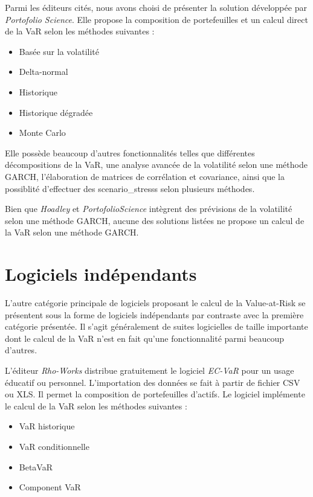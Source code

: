 		Parmi les éditeurs cités, nous avons choisi de présenter la solution développée par \textit{Portofolio Science}. Elle propose la composition de portefeuilles et un calcul direct de la VaR selon les méthodes suivantes :
		\begin{itemize}
			\item Basée sur la volatilité
			\item Delta-normal
			\item Historique
			\item Historique dégradée
			\item Monte Carlo
		\end{itemize}

		Elle possède beaucoup d’autres fonctionnalités telles que différentes décompositions de la VaR, une analyse avancée de la volatilité selon une méthode GARCH, l’élaboration de matrices de corrélation et covariance, ainsi que la possiblité d’effectuer des \glspl{scenario_stress} selon plusieurs méthodes. 

		Bien que \textit{Hoadley} et \textit{PortofolioScience} intègrent des prévisions de la volatilité selon une méthode GARCH, aucune des solutions listées ne propose un calcul de la VaR selon une méthode GARCH.


	\section{Logiciels indépendants}

		L’autre catégorie principale de logiciels proposant le calcul de la Value-at-Risk se présentent sous la forme de logiciels indépendants par contraste avec la première catégorie présentée. Il s’agit généralement de suites logicielles de taille importante dont le calcul de la VaR n’est en fait qu’une fonctionnalité parmi beaucoup d’autres.

		L’éditeur \textit{Rho-Works} distribue gratuitement le logiciel \textit{EC-VaR} pour un usage éducatif ou personnel. L’importation des données se fait à partir de fichier CSV ou XLS. Il permet la composition de portefeuilles d’actifs. Le logiciel implémente le calcul de la VaR selon les méthodes suivantes :
		\begin{itemize}
			\item VaR historique
			\item VaR conditionnelle
			\item BetaVaR
			\item Component VaR %
		\end{itemize}

